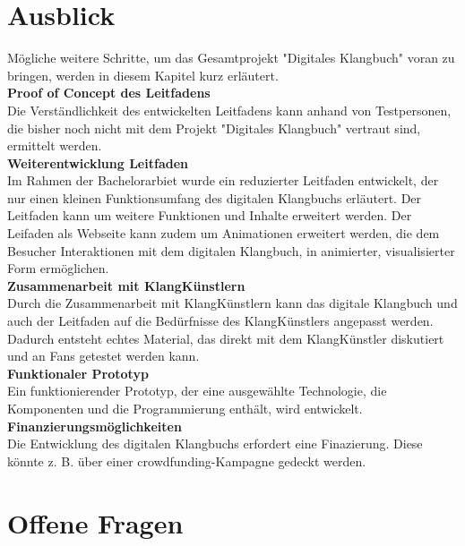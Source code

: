 \chapter{Ausblick}
Mögliche weitere Schritte, um das Gesamtprojekt "Digitales Klangbuch" voran zu bringen, werden in diesem Kapitel kurz erläutert.\\


\textbf{Proof of Concept des Leitfadens}\\
Die Verständlichkeit des entwickelten Leitfadens kann anhand von Testpersonen, die bisher noch nicht mit dem Projekt "Digitales Klangbuch" vertraut sind, ermittelt werden.\\


\textbf{Weiterentwicklung Leitfaden}\\
Im Rahmen der Bachelorarbiet wurde ein reduzierter Leitfaden entwickelt, der nur einen kleinen Funktionsumfang des digitalen Klangbuchs erläutert. Der Leitfaden kann um weitere Funktionen und Inhalte erweitert werden. Der Leifaden als Webseite kann zudem um Animationen erweitert werden, die dem Besucher Interaktionen mit dem digitalen Klangbuch, in animierter, visualisierter Form ermöglichen.\\


\textbf{Zusammenarbeit mit KlangKünstlern}\\
Durch die Zusammenarbeit mit KlangKünstlern kann das digitale Klangbuch und auch der Leitfaden auf die Bedürfnisse des KlangKünstlers angepasst werden. Dadurch entsteht echtes Material, das direkt mit dem KlangKünstler diskutiert und an Fans getestet werden kann.\\


\textbf{Funktionaler Prototyp}\\
Ein funktionierender Prototyp, der eine ausgewählte Technologie, die Komponenten und die Programmierung enthält, wird entwickelt.\\


\textbf{Finanzierungsmöglichkeiten}\\
Die Entwicklung des digitalen Klangbuchs erfordert eine Finazierung. Diese könnte z. B. über einer \gls{crowdfunding}-Kampagne gedeckt werden.\\



\chapter{Offene Fragen}

